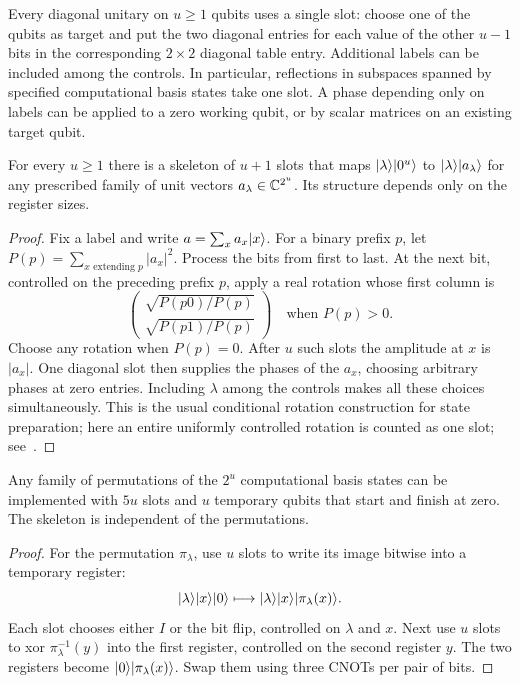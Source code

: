 Every diagonal unitary on $u\ge1$ qubits uses a single slot: choose one of
the qubits as target and put the two diagonal entries for each value of the
other $u-1$ bits in the corresponding $2\times2$ diagonal table entry.
Additional labels can be included among the controls. In particular,
reflections in subspaces spanned by specified computational basis states
take one slot. A phase depending only on labels can be applied to a zero
working qubit, or by scalar matrices on an existing target qubit.

\begin{lemma}\label{slot:preparation}
For every $u\ge1$ there is a skeleton of $u+1$ slots that maps
$\lvert \lambda\rangle\lvert 0^u\rangle$ to $\lvert \lambda\rangle\lvert a_\lambda\rangle$ for any prescribed
family of unit vectors $a_\lambda\in\mathbb C^{2^u}$. Its structure depends only on
the register sizes.
\end{lemma}

\begin{proof}
Fix a label and write $a=\sum_x a_x\lvert x\rangle$. For a binary prefix $p$, let
$P(p)=\sum_{x\text{ extending }p}|a_x|^2$. Process the bits from first to last.
At the next bit, controlled on the preceding prefix $p$, apply a real
rotation whose first column is
\[
 \begin{pmatrix}
  \sqrt{P(p0)/P(p)}\\[2pt]
  \sqrt{P(p1)/P(p)}
 \end{pmatrix}
 \quad\text{when }P(p)>0.
\]
Choose any rotation when $P(p)=0$. After $u$ such slots the amplitude at $x$
is $|a_x|$. One diagonal slot then supplies the phases of the $a_x$, choosing
arbitrary phases at zero entries. Including $\lambda$ among the controls
makes all these choices simultaneously. This is the usual conditional
rotation construction for state preparation; here an entire uniformly
controlled rotation is counted as one slot; see~\cite{MVBS2005,BVMS2005}.
\end{proof}

\begin{lemma}\label{slot:permutation}
Any family of permutations of the $2^u$ computational basis states can be
implemented with $5u$ slots and $u$ temporary qubits that start and finish
at zero. The skeleton is independent of the permutations.
\end{lemma}

\begin{proof}
For the permutation $\pi_\lambda$, use $u$ slots to write its image bitwise
into a temporary register:
\[
 \lvert \lambda\rangle\lvert x\rangle\lvert 0\rangle
 \longmapsto \lvert \lambda\rangle\lvert x\rangle\lvert \pi_\lambda(x)\rangle.
\]
Each slot chooses either $I$ or the bit flip, controlled on $\lambda$ and
$x$. Next use $u$ slots to xor $\pi_\lambda^{-1}(y)$ into the first register,
controlled on the second register $y$. The two registers become
$\lvert 0\rangle\lvert \pi_\lambda(x)\rangle$. Swap them using three CNOTs per pair of bits.
\end{proof}

